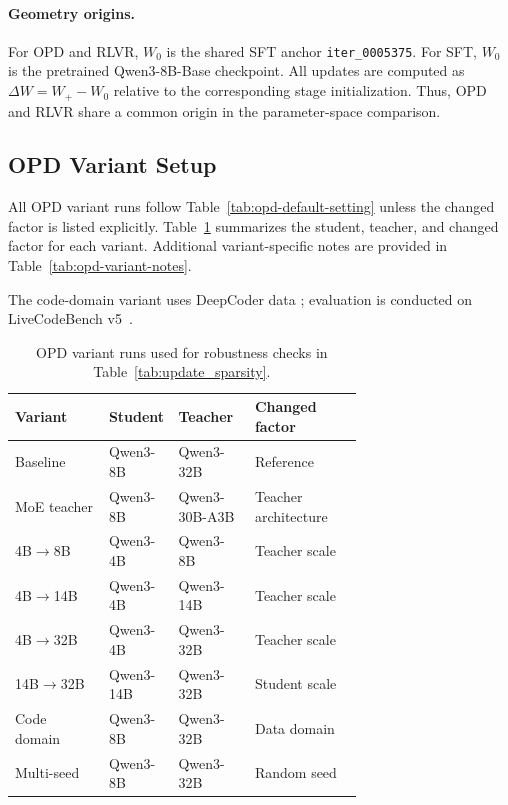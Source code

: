 \paragraph{Geometry origins.}
For OPD and RLVR, $W_0$ is the shared SFT anchor
\texttt{iter\_0005375}. For SFT, $W_0$ is the pretrained Qwen3-8B-Base
checkpoint. All updates are computed as $\Delta W = W_+ - W_0$ relative to
the corresponding stage initialization. Thus, OPD and RLVR share a common
origin in the parameter-space comparison.

\subsection{OPD Variant Setup}
\label{app:opd-variants}

All OPD variant runs follow Table~\ref{tab:opd-default-setting} unless the
changed factor is listed explicitly. Table~\ref{tab:opd-variants}
summarizes the student, teacher, and changed factor for each variant. Additional variant-specific notes are provided in
Table~\ref{tab:opd-variant-notes}.

The code-domain variant uses DeepCoder data \cite{deepcoder2025};
evaluation is conducted on LiveCodeBench v5~\cite{jain2024livecodebenchholisticcontaminationfree}.

\begin{table}[t]
\centering
\small
\setlength{\tabcolsep}{3.5pt}
\renewcommand{\arraystretch}{1.08}
\begin{tabularx}{\linewidth}{@{}p{0.27\linewidth}p{0.20\linewidth}p{0.22\linewidth}X@{}}
\toprule
\textbf{Variant} & \textbf{Student} & \textbf{Teacher} & \textbf{Changed factor} \\
\midrule
Baseline & Qwen3-8B & Qwen3-32B & Reference \\
MoE teacher & Qwen3-8B & Qwen3-30B-A3B & Teacher architecture \\
4B$\rightarrow$8B & Qwen3-4B & Qwen3-8B & Teacher scale \\
4B$\rightarrow$14B & Qwen3-4B & Qwen3-14B & Teacher scale \\
4B$\rightarrow$32B & Qwen3-4B & Qwen3-32B & Teacher scale \\
14B$\rightarrow$32B & Qwen3-14B & Qwen3-32B & Student scale \\
Code domain & Qwen3-8B & Qwen3-32B & Data domain \\
Multi-seed & Qwen3-8B & Qwen3-32B & Random seed \\
\bottomrule
\end{tabularx}
\caption{
OPD variant runs used for robustness checks in
Table~\ref{tab:update_sparsity}.
}
\label{tab:opd-variants}
\end{table}


